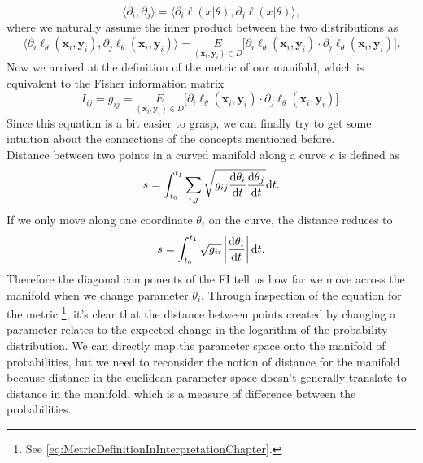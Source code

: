 \begin{equation}
	\langle \partial_i, \partial_j \rangle = \langle \partial_i \ell(x|\theta), \partial_j \ell(x|\theta) \rangle,
\end{equation}
where we naturally assume the inner product between the two distributions as
\begin{equation}
	 \langle \partial_i \ell_\theta(\mathbf{x}_i,\mathbf{y}_i), \partial_j \ell_\theta(\mathbf{x}_i,\mathbf{y}_i) \rangle = \underset{(\mathbf{x}_i,\mathbf{y}_i)\in D}{E} \big[\partial_i \ell_\theta(\mathbf{x}_i,\mathbf{y}_i) \cdot \partial_j \ell_\theta(\mathbf{x}_i,\mathbf{y}_i)\big].
\end{equation}
Now we arrived at the definition of the metric of our manifold, which is equivalent to the Fisher information matrix
\begin{equation}\label{eq:MetricDefinitionInInterpretationChapter}
	I_{ij} = g_{ij} = \underset{(\mathbf{x}_i,\mathbf{y}_i)\in D}{E} \big[\partial_i \ell_\theta(\mathbf{x}_i,\mathbf{y}_i) \cdot \partial_j \ell_\theta(\mathbf{x}_i,\mathbf{y}_i)\big].
\end{equation}
Since this equation is a bit easier to grasp, we can finally try to get some intuition about the connections of the concepts mentioned before.\\
Distance between two points in a curved manifold along a curve $c$ is defined as \cite{AmarisLectureNotes}
\begin{equation}
	s = \int_{t_0}^{t_1} \sum_{i,j} \sqrt{g_{ij}\frac{\mathrm{d}\theta_i}{\mathrm{d}t}\frac{\mathrm{d}\theta_j}{\mathrm{d}t}} \mathrm{d}t. 
\end{equation}
If we only move along one coordinate $\theta_i$ on the curve, the distance reduces to 
\begin{equation}
	s = \int_{t_0}^{t_1} \sqrt{g_{ii}}\left|\frac{\mathrm{d}\theta_i}{\mathrm{d}t} \right| \mathrm{d}t. 
\end{equation}
Therefore the diagonal components of the FI tell us how far we move across the manifold when we change parameter $\theta_i$. Through inspection of the equation for the metric \footnote{See \cref{eq:MetricDefinitionInInterpretationChapter}.}, it's clear that the distance between points created by changing a parameter relates to the expected change in the logarithm of the probability distribution. We can directly map the parameter space onto the manifold of probabilities, but we need to reconsider the notion of distance for the manifold because distance in the euclidean parameter space doesn't generally translate to distance in the manifold, which is a measure of difference between the probabilities.\\
